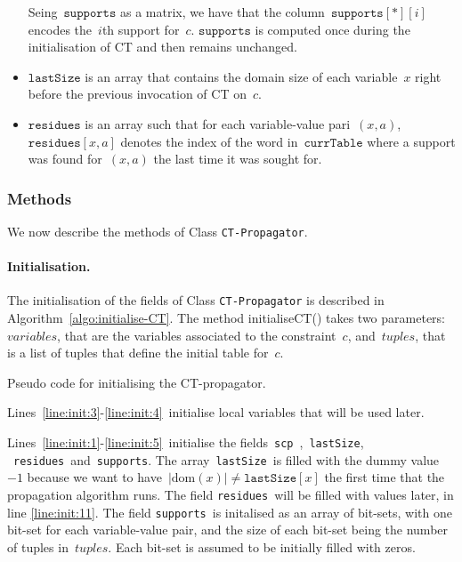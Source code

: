 \documentclass[a4paper,11pt]{article}
\newcommand{\Algoref}[1]{Algorithm~\ref{#1}}
\newcommand{\Linesref}[2]{Lines~\ref{#1}-\ref{#2}}
\newcommand{\Dom}[1]{\text{dom}({#1})}
\newcommand{\Scp}{\texttt{scp}}
\newcommand{\CurrTable}{\texttt{currTable}}
\newcommand{\LastSizes}{\texttt{lastSize}}
\newcommand{\Supports}{\texttt{supports}}
\newcommand{\Residues}{\texttt{residues}}
\newcommand{\localvar}[1]{\mathit{#1}}
\numberwithin{equation}{section}
\begin{document}
\begin{itemize}
    Seing~$\Supports$ as a matrix, we have that the column~$\Supports[*][i]$ encodes
    the~$i$th support for~$c$. $\Supports$ is computed once during the initialisation of CT and then
    remains unchanged.
    
  \item $\LastSizes$ is an array that contains the domain size of each
    variable~$x$ right before the previous invocation of CT on~$c$.

  \item $\Residues$ is an array such that for each variable-value pari~$(x,a)$,
    $\Residues[x,a]$ denotes the index of the word in~$\CurrTable$ where a support
    was found for~$(x,a)$ the last time it was sought for.

\end{itemize}

\subsubsection{Methods}

We now describe the methods of Class \texttt{CT-Propagator}.

\paragraph{Initialisation.}
The initialisation of the fields of Class \texttt{CT-Propagator} is described in
\Algoref{algo:initialise-CT}. The method initialiseCT() takes two parameters:
$\localvar{variables}$, that are the variables associated to the constraint~$c$,
and~$\localvar{tuples}$, that is a list of tuples that define the initial table for~$c$.

\begin{algorithm}[H]
  \begin{algorithmic}[1]  %
    
  \end{algorithmic}
  \caption{Pseudo code for initialising the CT-propagator.}
  \label{algo:initialise-CT}
\end{algorithm}


\Linesref{line:init:3}{line:init:4}~initialise local variables that will be 
used later.

\Linesref{line:init:1}{line:init:5}~initialise the fields~\Scp~,~\LastSizes,
~\Residues~and~\Supports.
The array~\LastSizes~is filled with 
the dummy value~$-1$ because we
want to have~$|\Dom{x}| \neq \LastSizes[x]$ the first time that the propagation
algorithm runs. The field \Residues~will be filled with values later, 
in line \ref{line:init:11}.
The field \Supports~is initalised as an array of bit-sets, with one bit-set for each
variable-value pair, and the size of each
bit-set being the number of tuples in~$\localvar{tuples}$. Each bit-set is assumed
to be initially filled with zeros.
\end{document}
